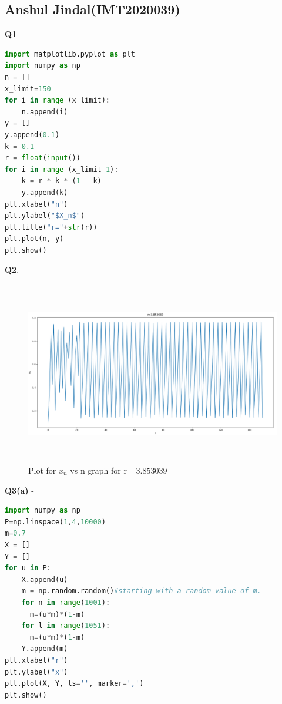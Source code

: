 \documentclass[11pt]{scrartcl} %
\begin{document}
\subsection{Anshul Jindal(IMT2020039)}
\textbf{Q1} -
\begin{lstlisting}[language=Python, caption= Code for plotting $X_n$ vs n graph for a given r]
import matplotlib.pyplot as plt
import numpy as np
n = []
x_limit=150
for i in range (x_limit):
    n.append(i)
y = []
y.append(0.1)
k = 0.1
r = float(input())
for i in range (x_limit-1):
    k = r * k * (1 - k)
    y.append(k)
plt.xlabel("n")
plt.ylabel("$X_n$")
plt.title("r="+str(r))
plt.plot(n, y)
plt.show() 
\end{lstlisting}
\textbf{Q2}.
\begin{figure}[h] %
	\centering
	\includegraphics[width=12cm, height=8cm]{anshul_bsdk.png} %
	\caption {Plot for $x_n$ vs n graph for r= 3.853039}
\end{figure}
\newpage
\textbf{Q3(a)} -
\begin{lstlisting}[language=Python, caption= Bifurcation diagram]
import numpy as np
P=np.linspace(1,4,10000)
m=0.7
X = []
Y = []
for u in P:
    X.append(u)
    m = np.random.random()#starting with a random value of m.
    for n in range(1001):
      m=(u*m)*(1-m)
    for l in range(1051):
      m=(u*m)*(1-m)
    Y.append(m)
plt.xlabel("r")
plt.ylabel("x")
plt.plot(X, Y, ls='', marker=',')
plt.show()
\end{lstlisting}
\newpage
\end{document}
